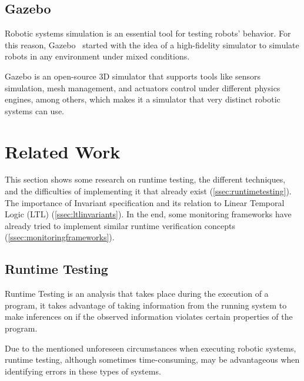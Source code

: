 \subsection{Gazebo}
\label{ssec:gazebo}

Robotic systems simulation is an essential tool for testing robots' behavior. For this reason, Gazebo~\cite{koenig2004design} started with the idea of a high-fidelity simulator to simulate robots in any environment under mixed conditions.

Gazebo is an open-source 3D simulator that supports tools like sensors simulation, mesh management, and actuators control under different physics engines, among others, which makes it a simulator that very distinct robotic systems can use.


\section{Related Work}
\label{sec:relatedwork}

This section shows some research on runtime testing, the different techniques, and the difficulties of implementing it that already exist (\autoref{ssec:runtimetesting}). The importance of Invariant specification and its relation to Linear Temporal Logic (LTL) (\autoref{ssec:ltlinvariants}). In the end, some monitoring frameworks have already tried to implement similar runtime verification concepts (\autoref{ssec:monitoringframeworks}).


\subsection{Runtime Testing}
\label{ssec:runtimetesting}

Runtime Testing is an analysis that takes place during the execution of a program, it takes advantage of taking information from the running system to make inferences on if the observed information violates certain properties of the program.

Due to the mentioned unforeseen circumstances when executing robotic systems, runtime testing, although sometimes time-consuming, may be advantageous when identifying errors in these types of systems.

